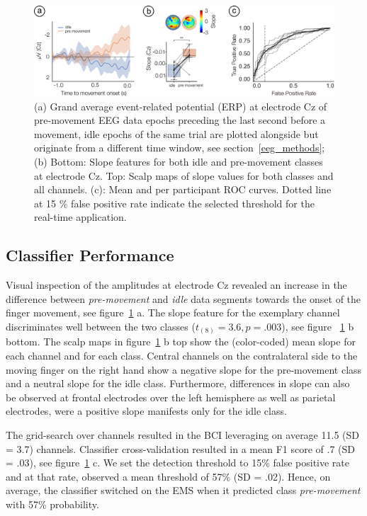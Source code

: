 \begin{figure}
    \centering
    \includegraphics[width=\textwidth]{figures/eeg_results.pdf}
    \caption{(a) Grand average event-related potential (ERP) at electrode Cz of pre-movement EEG data epochs preceding the last second before a movement, idle epochs of the same trial are plotted alongside but originate from a different time window, see section~\ref{eeg_methods}; (b) Bottom: Slope features for both idle and pre-movement classes at electrode Cz. Top: Scalp maps of slope values for both classes and all channels. (c): Mean and per participant ROC curves. Dotted line at 15 \% false positive rate indicate the selected threshold for the real-time application.}
    \label{fig:EEG_results}
\end{figure}

\subsection{Classifier Performance}
Visual inspection of the amplitudes at electrode Cz revealed an increase in the difference between \textit{pre-movement} and \textit{idle} data segments towards the onset of the finger movement, see figure~\ref{fig:EEG_results} a. The slope feature for the exemplary channel discriminates well between the two classes (${t_{(8)}} = 3.6, p = .003$), see figure ~\ref{fig:EEG_results} b bottom. The scalp maps in figure~\ref{fig:EEG_results} b top show the (color-coded) mean slope for each channel and for each class. Central channels on the contralateral side to the moving finger on the right hand show a negative slope for the pre-movement class and a neutral slope for the idle class. Furthermore, differences in slope can also be observed at frontal electrodes over the left hemisphere as well as parietal electrodes, were a positive slope manifests only for the idle class. 

The grid-search over channels resulted in the BCI leveraging on average 11.5 (SD = 3.7) channels. Classifier cross-validation resulted in a mean F1 score of .7 (SD = .03), see figure~\ref{fig:EEG_results} c. We set the detection threshold to 15\% false positive rate and at that rate, observed a mean threshold of 57\% (SD = .02). Hence, on average, the classifier switched on the EMS when it predicted class \textit{pre-movement} with 57\% probability.


